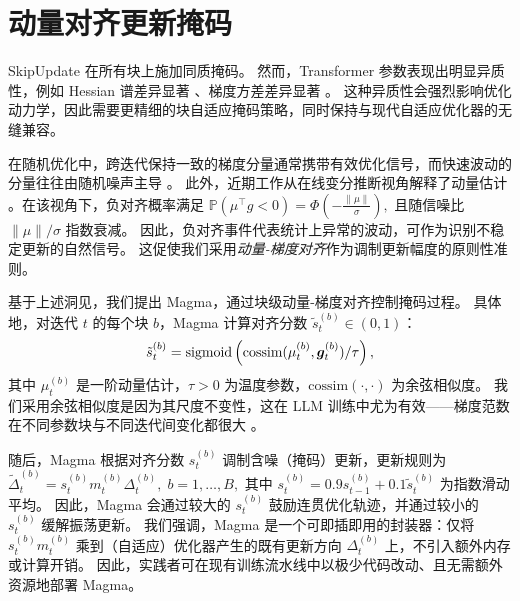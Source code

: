 \documentclass[11pt, a4paper, twocolumn, copyright, goog]{google}
\theoremstyle{plain}
\theoremstyle{definition}
\theoremstyle{remark}
\begin{document}




\section{动量对齐更新掩码} \label{sec:mainsection}
SkipUpdate 在所有块上施加同质掩码。
然而，Transformer 参数表现出明显异质性，例如 Hessian 谱差异显著 \citep{zhang2024transformers}、梯度方差差异显著 \citep{orvieto2025search}。 
这种异质性会强烈影响优化动力学，因此需要更精细的块自适应掩码策略，同时保持与现代自适应优化器的无缝兼容。

在随机优化中，跨迭代保持一致的梯度分量通常携带有效优化信号，而快速波动的分量往往由随机噪声主导 \citep{polyak1964some,riedmiller1993direct,bottou2018optimization}。
此外，近期工作从在线变分推断视角解释了动量估计 \citep{orvieto2025search}。在该视角下，负对齐概率满足
$\mathbb{P}(\mu^\top g < 0) = \Phi \left(-\frac{\|\mu\|}{\sigma} \right),$ 且随信噪比 $\|\mu\|/\sigma$ 指数衰减。
因此，负对齐事件代表统计上异常的波动，可作为识别不稳定更新的自然信号。
这促使我们采用\emph{动量-梯度对齐}作为调制更新幅度的原则性准则。



基于上述洞见，我们提出 Magma，通过块级动量-梯度对齐控制掩码过程。
具体地，对迭代 $t$ 的每个块 $b$，Magma 计算对齐分数 $\tilde{s}_t^{(b)} \in (0,1)$：
\begin{equation} \label{eq:masking_prob}
    \tilde{s}_t^{(b)} = \operatorname{sigmoid}\left( \textrm{cossim}(\mu_t^{(b)}, {\bm{g}}_t^{(b)}) / \tau \right),
\end{equation}
其中 $\mu_t^{(b)}$ 是一阶动量估计，$\tau > 0$ 为温度参数，$\textrm{cossim}(\cdot, \cdot)$ 为余弦相似度。 
我们采用余弦相似度是因为其尺度不变性，这在 LLM 训练中尤为有效——梯度范数在不同参数块与不同迭代间变化都很大 \citep{huang2025spam, wen2025sron}。 


随后，Magma 根据对齐分数 $s_t^{(b)}$ 调制含噪（掩码）更新，更新规则为 $\tilde{\Delta}_t^{(b)} =  s_t^{(b)} m_{t}^{(b)}\Delta_t^{(b)}, \; b = 1,\ldots,B,$ 其中 $s_t^{(b)} = 0.9 s_{t-1}^{(b)} + 0.1 \tilde{s}_t^{(b)}$ 为指数滑动平均。
因此，Magma 会通过较大的 $s_t^{(b)}$ 鼓励连贯优化轨迹，并通过较小的 $s_t^{(b)}$ 缓解振荡更新。 
我们强调，Magma 是一个可即插即用的封装器：仅将 $s_t^{(b)} m_{t}^{(b)}$ 乘到（自适应）优化器产生的既有更新方向 $\Delta_t^{(b)}$ 上，不引入额外内存或计算开销。
因此，实践者可在现有训练流水线中以极少代码改动、且无需额外资源地部署 Magma。
\end{document}
